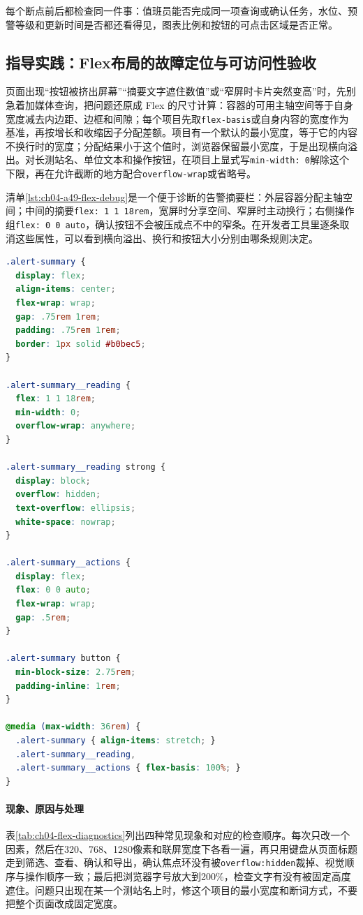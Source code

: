 每个断点前后都检查同一件事：值班员能否完成同一项查询或确认任务，水位、预警等级和更新时间是否都还看得见，图表比例和按钮的可点击区域是否正常。

\subsection{指导实践：Flex布局的故障定位与可访问性验收}

页面出现“按钮被挤出屏幕”“摘要文字遮住数值”或“窄屏时卡片突然变高”时，先别急着加媒体查询，把问题还原成 Flex 的尺寸计算：容器的可用主轴空间等于自身宽度减去内边距、边框和间隙；每个项目先取\texttt{flex-basis}或自身内容的宽度作为基准，再按增长和收缩因子分配差额。项目有一个默认的最小宽度，等于它的内容不换行时的宽度；分配结果小于这个值时，浏览器保留最小宽度，于是出现横向溢出。对长测站名、单位文本和操作按钮，在项目上显式写\texttt{min-width: 0}解除这个下限，再在允许截断的地方配合\texttt{overflow-wrap}或省略号。

清单\ref{lst:ch04-a49-flex-debug}是一个便于诊断的告警摘要栏：外层容器分配主轴空间；中间的摘要\texttt{flex: 1 1 18rem}，宽屏时分享空间、窄屏时主动换行；右侧操作组\texttt{flex: 0 0 auto}，确认按钮不会被压成点不中的窄条。在开发者工具里逐条取消这些属性，可以看到横向溢出、换行和按钮大小分别由哪条规则决定。

\begin{lstlisting}[label={lst:ch04-a49-flex-debug},language=CSS,caption={可诊断的告警摘要 Flex 样式}]
.alert-summary {
  display: flex;
  align-items: center;
  flex-wrap: wrap;
  gap: .75rem 1rem;
  padding: .75rem 1rem;
  border: 1px solid #b0bec5;
}

.alert-summary__reading {
  flex: 1 1 18rem;
  min-width: 0;
  overflow-wrap: anywhere;
}

.alert-summary__reading strong {
  display: block;
  overflow: hidden;
  text-overflow: ellipsis;
  white-space: nowrap;
}

.alert-summary__actions {
  display: flex;
  flex: 0 0 auto;
  flex-wrap: wrap;
  gap: .5rem;
}

.alert-summary button {
  min-block-size: 2.75rem;
  padding-inline: 1rem;
}

@media (max-width: 36rem) {
  .alert-summary { align-items: stretch; }
  .alert-summary__reading,
  .alert-summary__actions { flex-basis: 100%; }
}
\end{lstlisting}

\paragraph{现象、原因与处理}表\ref{tab:ch04-flex-diagnostics}列出四种常见现象和对应的检查顺序。每次只改一个因素，然后在320、768、1280像素和联屏宽度下各看一遍，再只用键盘从页面标题走到筛选、查看、确认和导出，确认焦点环没有被\texttt{overflow:hidden}裁掉、视觉顺序与操作顺序一致；最后把浏览器字号放大到200\%，检查文字有没有被固定高度遮住。问题只出现在某一个测站名上时，修这个项目的最小宽度和断词方式，不要把整个页面改成固定宽度。

